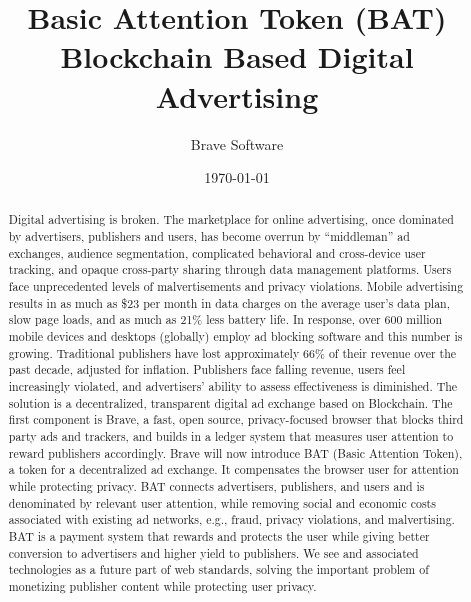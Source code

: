 \documentclass[11pt]{article}
\begin{document}
\title{%
Basic Attention Token (BAT) \\[1mm] 
\large Blockchain Based Digital Advertising}
\author{Brave Software}
\date{\today}
\maketitle


\begin{abstract}
Digital advertising is broken. 
The marketplace for online advertising, once dominated by advertisers, publishers and users, has become overrun by ``middleman'' ad exchanges, audience segmentation, complicated behavioral and cross-device user tracking, and opaque cross-party sharing through data management platforms.
Users face unprecedented levels of malvertisements and privacy violations. Mobile advertising results in as much as \$23 per month in data charges on the average user's data plan, slow page loads, and as much as 21\% less battery life.  
In response, over 600 million mobile devices and desktops (globally) employ ad blocking software and this number is growing. 
Traditional publishers have lost approximately 66\% of their revenue over the past decade, adjusted for inflation. 
Publishers face falling revenue, users feel increasingly violated, and advertisers' ability to assess effectiveness is diminished. 
The solution is a decentralized, transparent digital ad exchange based on Blockchain. 
The first component is Brave, a fast, open source, privacy-focused browser that blocks third party ads and trackers, and builds in a ledger system that measures user attention to  reward publishers accordingly. 
Brave will now introduce \textrm{BAT} (Basic Attention Token), a token for a decentralized ad exchange. It compensates the browser user for attention while protecting privacy.
\textrm{BAT} connects advertisers, publishers, and users and is denominated by relevant user attention, while removing social and economic costs associated with existing ad networks, e.g., fraud, privacy violations, and malvertising.
\textrm{BAT} is a payment system that rewards and protects the user while giving better conversion to advertisers and higher yield to publishers.
We see  and associated technologies as a future part of web standards, solving the important problem of monetizing publisher content while protecting user privacy. 

\end{abstract}
\pagebreak
\end{document}
